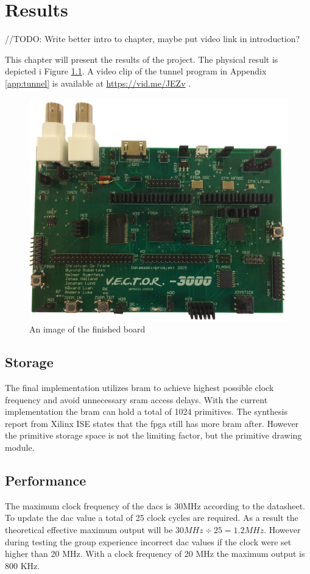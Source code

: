 \chapter{Results}
//TODO: Write better intro to chapter, maybe put video link in introduction?

This chapter will present the results of the project. The physical result is depicted i Figure \ref{fig:board-top}.
A video clip of the tunnel program in Appendix \ref{app:tunnel} is available at \href{https://vid.me/JEZv}{https://vid.me/JEZv} \cite{tunnel-demo}.

\begin{figure}[h!]
	    \includegraphics[width=\linewidth]{images/board_top.jpg}
	    \caption{An image of the finished \vthreek board}
	    \label{fig:board-top}
\end{figure}

\section{Storage}
The final implementation utilizes \gls{bram} to achieve highest possible clock frequency and avoid unnecessary \gls{sram} access delays.
With the current implementation the \gls{bram} can hold a total of 1024 primitives.
The synthesis report from Xilinx ISE states that the \gls{fpga} still has more \gls{bram} after.
However the primitive storage space is not the limiting factor, but the primitive drawing module.

\section{Performance}
The maximum clock frequency of the \gls{dac}s is 30MHz according to the datasheet.
To update the \gls{dac} value a total of 25 clock cycles are required.
As a result the theoretical effective maximum output will be \(30 MHz \div 25 = 1.2 MHz \).
However during testing the group experience incorrect \gls{dac} values if the clock were set higher than 20 MHz.
With a clock frequency of 20 MHz the maximum output is 800 KHz.

